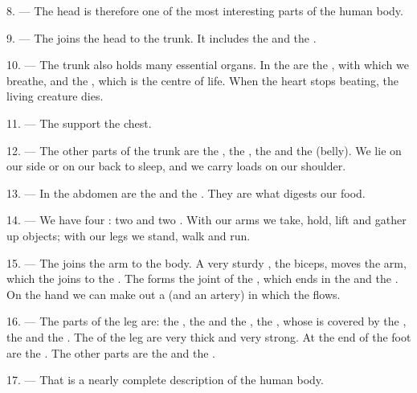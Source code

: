 8. --- The head is therefore one of the most interesting parts of the human body.

\VUsaut{4.4mm}
\VUsaut{3.0mm}

9. --- The  joins the head to the trunk. It includes the
 and the .

10. --- The trunk also holds many essential organs. In the  are the
, with which we breathe, and the , which is the centre of life.
When the heart stops beating, the living creature dies.

11. --- The  support the chest.

12. --- The other parts of the trunk are the , the
, the  and the  (belly). We lie
on our side or on our back to sleep, and we carry loads on our shoulder.

13. --- In the abdomen are the  and the . They are what
digests our food.

\VUsaut{4.4mm}
\VUsaut{3.0mm}

14. --- We have four : two  and two . With our arms we
take, hold, lift and gather up objects; with our legs we stand, walk and run.

15. --- The  joins the arm to the body. A very sturdy
, the biceps, moves the arm, which the  joins to
the . The  forms the joint of the , which ends in
the  and the . On the hand we can make out a  (and
an artery) in which the  flows.

16. --- The parts of the leg are: the , the  and the
, the , whose  is covered by the
, the  and the . The
 of the leg are very thick and very strong. At the end of the
foot are the . The other parts are the  and the
.

17. --- That is a nearly complete description of the human body.

